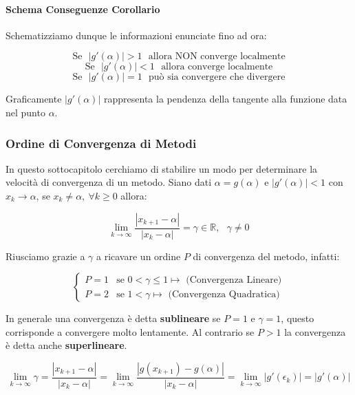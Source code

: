 \documentclass{article}
\begin{document}
\paragraph{Schema Conseguenze Corollario} Schematizziamo dunque le informazioni enunciate fino ad ora:

\vspace*{10px}

\[ \boxed{ \text{Se} \:\:\: |g'(\alpha)| > 1 \:\:\: \text{allora NON converge localmente} } \]
\vspace*{5px}
\[ \boxed{ \text{Se} \:\:\: |g'(\alpha)| < 1 \:\:\: \text{allora converge localmente} } \]
\vspace*{5px}
\[ \boxed{ \text{Se} \:\:\: |g'(\alpha)| = 1 \:\:\: \text{può sia convergere che divergere} } \]
\vspace*{5px}

Graficamente $|g'(\alpha)|$ rappresenta la pendenza della tangente alla funzione data \\ nel punto $\alpha$.

\newpage

\subsubsection{Ordine di Convergenza di Metodi}

In questo sottocapitolo cerchiamo di stabilire un modo per determinare la velocità di convergenza di un metodo. Siano dati
$\alpha = g(\alpha)$ e $|g'(\alpha)| < 1$ con $x_{k} \rightarrow \alpha$, se $x_{k} \neq \alpha, \: \forall k \geq 0 $ allora:

\[ \lim_{k \rightarrow \infty} \frac{|x_{k+1} - \alpha|}{|x_{k} - \alpha |} = \gamma \in \mathbb{R}, \:\:\: \gamma \neq 0 \]

Riusciamo grazie a $\gamma$ a ricavare un ordine $P$ di convergenza del metodo, infatti:

\[
\left\{
\begin{array}{rl}
    P = 1 & \text{se } 0 < \gamma \leq 1 \mapsto \text{ (Convergenza Lineare)} \\
    P = 2 & \text{se } 1 < \gamma \mapsto \text{ (Convergenza Quadratica)} 
\end{array}
\right.
\]

In generale una convergenza è detta \textbf{sublineare} se $P=1$ e $\gamma = 1$, questo corrisponde a convergere molto lentamente. Al contrario se $P>1$ la convergenza
è detta anche \textbf{superlineare}.

\[ \lim_{k \rightarrow \infty} \gamma = \frac{|x_{k+1} - \alpha|}{|x_{k} - \alpha|} = \lim_{k \rightarrow \infty} \frac{|g(x_{k+1}) - g(\alpha)|}{|x_{k} - \alpha|} = \lim_{k \rightarrow \infty} |g'(\epsilon_{k})| = |g'(\alpha)| \]
\end{document}
